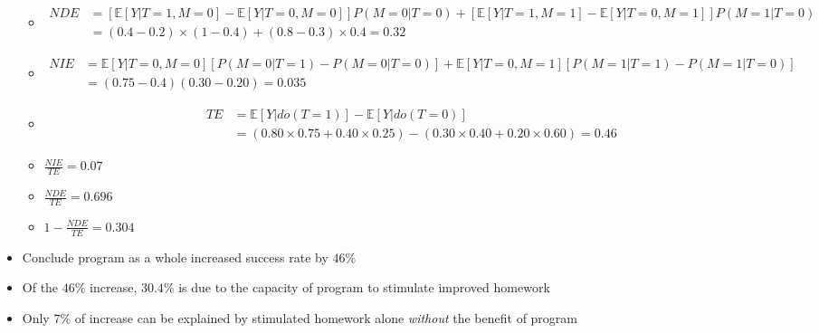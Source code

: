 \documentclass[]{article}
\begin{document}
\begin{itemize}
  \begin{itemize}
  \item
    \begin{equation}
    \begin{split}
      NDE &= [\mathbb{E}[Y|T = 1, M = 0] - \mathbb{E}[Y|T = 0, M = 0]]P(M = 0|T = 0) + [\mathbb{E}[Y|T = 1, M = 1] - \mathbb{E}[Y|T = 0, M = 1]]P(M = 1|T = 0) \\
      &= (0.4 - 0.2)\times(1 - 0.4) + (0.8 - 0.3)\times 0.4 = 0.32
    \end{split}
    \end{equation}
  \item
    \begin{equation}
    \begin{split}
    NIE &= \mathbb{E}[Y|T=0, M = 0][P(M=0|T=1) - P(M=0|T=0)] + \mathbb{E}[Y|T=0, M = 1][P(M=1|T=1) - P(M=1|T=0)]  \\
    &= (0.75 - 0.4)(0.30-0.20) = 0.035
    \end{split}
    \end{equation}
  \item
    \begin{equation}
    \begin{split}
    TE &= \mathbb{E}[Y|do(T=1)] - \mathbb{E}[Y|do(T = 0)] \\
       &= (0.80 \times 0.75 + 0.40 \times 0.25) - (0.30 \times 0.40 + 0.20 \times 0.60) = 0.46
     \end{split}
     \end{equation}
  \item
    \(\frac{NIE}{TE} = 0.07\)
  \item
    \(\frac{NDE}{TE} = 0.696\)
  \item
    \(1 - \frac{NDE}{TE} = 0.304\)
  \end{itemize}
\item
  Conclude program as a whole increased success rate by \(46\%\)
\item
  Of the \(46\%\) increase, \(30.4\%\) is due to the capacity of program
  to stimulate improved homework
\item
  Only \(7\%\) of increase can be explained by stimulated homework alone
  \emph{without} the benefit of program
\end{itemize}
\end{document}
